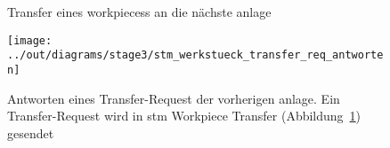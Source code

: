\begin{figure}
    \caption{Transfer eines \glspl{workpiece}s an die nächste \gls{anlage}}
    \label{fig:stm_werkstueck_transfer}
\end{figure}

\begin{figure}
    \centering
    \texttt{[image: ../out/diagrams/stage3/stm\_werkstueck\_transfer\_req\_antworten]}
    \caption{Antworten eines Transfer-Request der vorherigen \gls{anlage}.
    Ein Transfer-Request wird in stm Workpiece Transfer (Abbildung~\ref{fig:stm_werkstueck_transfer}) gesendet}
    \label{fig:stm_werkstueck_transfer_req_antworten}
\end{figure}




